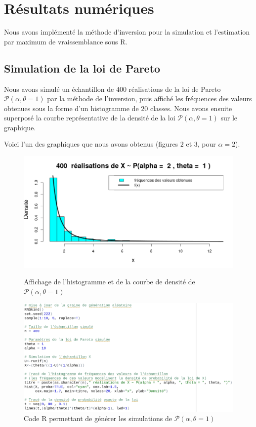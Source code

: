 \documentclass{article}
\begin{document}
\pagebreak

\section{Résultats numériques}

Nous avons implémenté la méthode d'inversion pour la simulation et l'estimation par maximum de vraissemblance sous R.

\subsection{Simulation de la loi de Pareto}

Nous avons simulé un échantillon de $400$ réalisations de la loi de Pareto $\mathcal{P}(\alpha,\theta=1)$ par la méthode de l'inversion, puis affiché les fréquences des valeurs obtenues sous la forme d'un histogramme de $20$ classes. Nous avons ensuite superposé la courbe représentative de la densité de la loi $\mathcal{P}(\alpha,\theta=1)$ sur le graphique.

Voici l'un des graphiques que nous avons obtenus (figures $2$ et $3$, pour $\alpha=2$).

\clearpage

\begin{figure}[!h]
\begin{center}
\includegraphics[width=12cm]{plot_hist}
\caption{Affichage de l'histogramme et de la courbe de densité de $\mathcal{P}(\alpha,\theta=1)$}
\vspace{\floatsep}
\vspace{\floatsep}
\vspace{\floatsep}
\includegraphics[width=12cm]{code_hist}
\caption{Code R permettant de générer les simulations de $\mathcal{P}(\alpha,\theta=1)$}
\end{center}
\end{figure}
\end{document}
